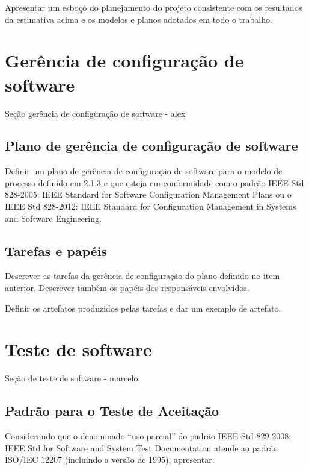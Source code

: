 Apresentar um esboço do planejamento do projeto
consistente com os resultados da estimativa acima e os
modelos e planos adotados em todo o trabalho.



\section{Gerência de configuração de software}
\label{sec:gerenciaconfig}

\large{Seção gerência de configuração de software - alex}

\subsection{Plano de gerência de configuração de software}

Definir um plano de gerência de configuração de software
para o modelo de processo definido em 2.1.3 e que esteja
em conformidade com o padrão IEEE Std 828-2005: IEEE
Standard for Software Configuration Management Plans ou
o IEEE Std 828-2012: IEEE Standard for Configuration
Management in Systems and Software Engineering.

\subsection{Tarefas e papéis}

Descrever as tarefas da gerência de configuração do plano
definido no item anterior. Descrever também os papéis dos
responsáveis envolvidos.

Definir os artefatos produzidos pelas tarefas e dar um
exemplo de artefato.



\section{Teste de software}
\label{sec:teste}

\large{Seção de teste de software - marcelo}

\subsection{Padrão para o Teste de Aceitação}

Considerando que o denominado “uso parcial” do padrão
IEEE Std 829-2008: IEEE Std for Software and System Test
Documentation atende ao padrão ISO/IEC 12207 (incluindo
a versão de 1995), apresentar:

